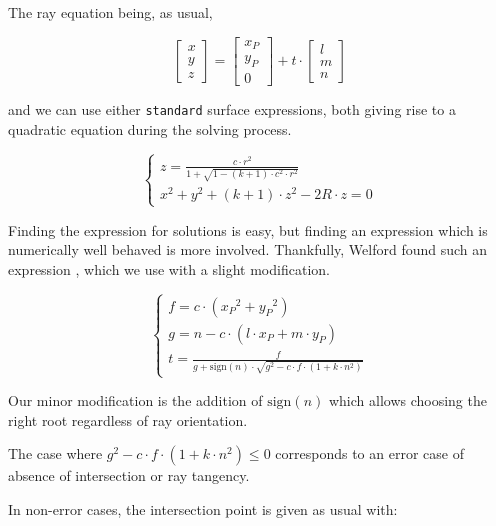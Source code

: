 The ray equation being, as usual,

\begin{equation}
\begin{bmatrix} x \\ y \\ z \end{bmatrix} =
\begin{bmatrix} x_P \\ y_P \\ 0 \end{bmatrix} + t \cdot
\begin{bmatrix} l \\ m \\ n \end{bmatrix}
\end{equation}

and we can use either \lstinline{standard} surface expressions, both giving
rise to a quadratic equation during the solving process.

\begin{equation} \begin{cases}
z = \frac{c \cdot r^2}{1 + \sqrt{1 - (k+1) \cdot c^2 \cdot r^2}} \\
x^2 + y^2 + (k+1) \cdot z^2 - 2R \cdot z = 0
\end{cases} \end{equation}

Finding the expression for solutions is easy, but finding an expression which
is numerically well behaved is more involved. Thankfully, Welford found such
an expression \cite{Welford:1986}, which we use with a slight modification.

\begin{equation} \begin{cases}
f = c \cdot ({x_P}^2 + {y_P}^2) \\
g = n - c \cdot (l \cdot x_P + m \cdot y_P) \\
t = \frac{f}{g + \textrm{sign}(n) \cdot
             \sqrt{g^2 - c \cdot f \cdot (1 + k \cdot n^2)}}
\end{cases} \end{equation}

Our minor modification is the addition of $\textrm{sign}(n)$ which allows
choosing the right root regardless of ray orientation.

The case where $g^2 - c \cdot f \cdot (1 + k \cdot n^2) \leq 0$ corresponds
to an error case of absence of intersection or ray tangency.

In non-error cases, the intersection point is given as usual with:

